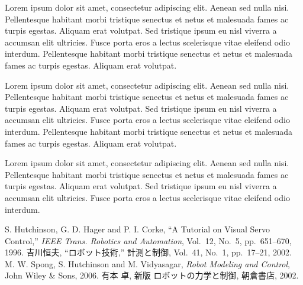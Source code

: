 \begin{multicols}{2}
Lorem ipsum dolor sit amet, consectetur adipiscing elit. Aenean sed
nulla nisi. Pellentesque habitant morbi tristique senectus et netus et malesuada
fames ac turpis egestas. Aliquam erat volutpat. Sed tristique ipsum eu nisl
viverra a accumsan elit ultricies. Fusce porta eros a lectus scelerisque vitae
eleifend odio interdum. Pellentesque habitant morbi tristique senectus et netus
et malesuada fames ac turpis egestas. Aliquam erat volutpat.

Lorem ipsum dolor sit amet, consectetur adipiscing elit. Aenean sed
nulla nisi. Pellentesque habitant morbi tristique senectus et netus et malesuada
fames ac turpis egestas. Aliquam erat volutpat. Sed tristique ipsum eu nisl
viverra a accumsan elit ultricies. Fusce porta eros a lectus scelerisque vitae
eleifend odio interdum. Pellentesque habitant morbi tristique senectus et netus
et malesuada fames ac turpis egestas. Aliquam erat volutpat.

Lorem ipsum dolor sit amet, consectetur adipiscing elit. Aenean sed
nulla nisi. Pellentesque habitant morbi tristique senectus et netus et malesuada
fames ac turpis egestas. Aliquam erat volutpat. Sed tristique ipsum eu nisl
viverra a accumsan elit ultricies. Fusce porta eros a lectus scelerisque vitae
eleifend odio interdum.

\begin{thebibliography}{99}
S. Hutchinson, G. D. Hager and P. I. Corke,
``A Tutorial on Visual Servo Control,''
{\it IEEE Trans. Robotics and Automation},
Vol.~12, No.~5, pp.~651--670, 1996.
%
吉川恒夫,
``ロボット技術,''
計測と制御, Vol.~41, No.~1, pp.~17--21, 2002.
%
M. W. Spong, S. Hutchinson and M. Vidyasagar, 
{\it Robot Modeling and Control}, 
John Wiley \& Sons, 2006. 
%
有本 卓, 新版 ロボットの力学と制御, 朝倉書店, 2002. 
\end{thebibliography}

\newpage %

\end{multicols}




